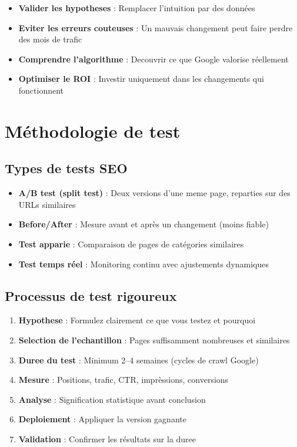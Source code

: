 \documentclass[12pt,a4paper,twoside]{report}
\begin{document}
\begin{itemize}
    \item \textbf{Valider les hypotheses} : Remplacer l'intuition par des données
    \item \textbf{Eviter les erreurs couteuses} : Un mauvais changement peut faire perdre des mois de trafic
    \item \textbf{Comprendre l'algorithme} : Decouvrir ce que Google valorise réellement
    \item \textbf{Optimiser le ROI} : Investir uniquement dans les changements qui fonctionnent
\end{itemize}

\section{Méthodologie de test}

\subsection{Types de tests SEO}

\begin{itemize}
    \item \textbf{A/B test (split test)} : Deux versions d'une meme page, reparties sur des URLs similaires
    \item \textbf{Before/After} : Mesure avant et après un changement (moins fiable)
    \item \textbf{Test apparie} : Comparaison de pages de catégories similaires
    \item \textbf{Test temps réel} : Monitoring continu avec ajustements dynamiques
\end{itemize}

\subsection{Processus de test rigoureux}

\begin{enumerate}
    \item \textbf{Hypothese} : Formulez clairement ce que vous testez et pourquoi
    \item \textbf{Selection de l'echantillon} : Pages suffisamment nombreuses et similaires
    \item \textbf{Duree du test} : Minimum 2--4 semaines (cycles de crawl Google)
    \item \textbf{Mesure} : Positions, trafic, CTR, imprèssions, conversions
    \item \textbf{Analyse} : Signification statistique avant conclusion
    \item \textbf{Deploiement} : Appliquer la version gagnante
    \item \textbf{Validation} : Confirmer les résultats sur la duree
\end{enumerate}
\end{document}
